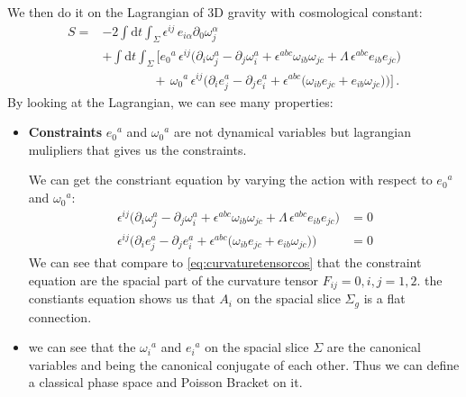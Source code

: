 We then do it on the Lagrangian of 3D gravity with cosmological constant:
\begin{align}
  S = {} & -2 \int \mathrm{d}t \int_{\Sigma} \epsilon^{ij} \,
  e_{i\alpha} \partial_{0} \omega_{j}^{\alpha} \\
  & + \int \mathrm{d}t \int_{\Sigma} \Bigg[
    e_{0}{}^{a} \, \epsilon^{ij} \Big(
      \partial_{i}\omega_{j}^{a}
      - \partial_{j}\omega_{i}^{a}
      + \epsilon^{abc}\omega_{ib}\omega_{jc}
      + \Lambda \, \epsilon^{abc} e_{ib} e_{jc}
    \Big) \\
    & \qquad\qquad
    + \, \omega_{0}{}^{a} \, \epsilon^{ij} \Big(
      \partial_{i}e_{j}^{a}
      - \partial_{j}e_{i}^{a}
      + \epsilon^{abc}\big(
        \omega_{ib} e_{jc}
        + e_{ib} \omega_{jc}
      \big)
    \Big)
  \Bigg] \, .
\end{align}
By looking at the Lagrangian, we can see many properties:
\begin{itemize}
  \item \textbf{Constraints} $ e_0{}^a $ and $ \omega_0{}^a $ are not
    dynamical variables but lagrangian mulipliers that gives us the
    constraints.

    We can get the constriant equation by varying the
    action with respect to $ e_0{}^a $ and $ \omega_0{}^a $:
    \begin{align}
      \epsilon^{ij} \Big(
        \partial_{i}\omega_{j}^{a}
        - \partial_{j}\omega_{i}^{a}
        + \epsilon^{abc}\omega_{ib}\omega_{jc}
        + \Lambda \, \epsilon^{abc} e_{ib} e_{jc}
      \Big) & = 0 \\
      \epsilon^{ij} \Big(
        \partial_{i}e_{j}^{a}
        - \partial_{j}e_{i}^{a}
        + \epsilon^{abc}\big(
          \omega_{ib} e_{jc}
          + e_{ib} \omega_{jc}
        \big)
      \Big) & = 0
    \end{align}
    We can see that compare to \cref{eq:curvaturetensorcos} that the
    constraint equation are the spacial part of the curvature tensor
    $ F_{ij} = 0, i,j = 1,2 $. the constiants equation shows us that
    $ A_i $ on the spacial slice $ \Sigma_g $ is a flat connection.
  \item we can see that the $ \omega_i{}^a $ and $ e_i{}^a $ on the
    spacial slice $ \Sigma $ are the canonical variables and being
    the canonical conjugate of each other. Thus we can define a
    classical phase space and Poisson Bracket on it.
\end{itemize}
